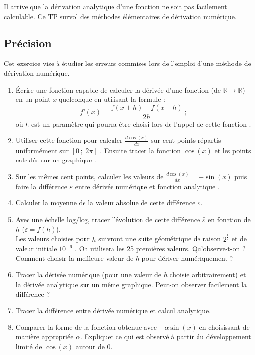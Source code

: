 Il  arrive que  la dérivation  analytique d'une  fonction ne  soit pas
facilement  calculable.  Ce TP  survol  des  méthodes élémentaires  de
dérivation numérique.

\subsection{Précision}
Cet exercice vise à étudier les erreurs commises lors de l'emploi d'une
méthode de dérivation numérique.
\begin{enumerate}
\item Écrire une fonction capable de calculer la dérivée d'une fonction
  (de  $\mathbb{R}  \longrightarrow  \mathbb{R}$)   en  un  point  $x$
  quelconque en utilisant la formule :
  $$f'(x)= \frac{f(x+h)-f(x-h)}{2h}\,;$$  où $h$ est un  paramètre qui
  pourra   être   choisi   lors   de   l'appel   de   cette   fonction
  .  %
\item Utiliser cette fonction  pour calculer $\frac{d\cos(x)}{dx}$ sur
  cent points répartis uniformément sur $[0\,;\,\,2\pi]$ .
  Ensuite tracer la  fonction $\cos(x)$ et les points  calculés sur un
  graphique .  %
\item   Sur  les   mêmes  cent   points,  calculer   les  valeurs   de
  $\frac{d\cos(x)}{dx}   =   -\sin(x)$   puis  faire   la   différence
  $\varepsilon$ entre dérivée numérique et fonction analytique %
.
\item Calculer  la moyenne  de la valeur  absolue de  cette différence
  $\bar{\varepsilon}$.  %
\item Avec  une échelle  log/log, tracer  l'évolution de  cette différence
  $\bar{\varepsilon}$         en        fonction         de        $h$
  ($\bar{\varepsilon}=f(h)$).\\ Les valeurs choisies pour $h$ suivront
  une  suite  géométrique  de  raison  $2^\frac{1}{2}$  et  de  valeur
  initiale  $10^{-6}$ .   On  utilisera  les 25  premières
  valeurs.  Qu'observe-t-on ?  Comment  choisir la meilleure valeur de
  $h$ pour dériver numériquement ?
\item  Tracer la  dérivée numérique  (pour une  valeur de  $h$ choisie
  arbitrairement)   et    la   dérivée   analytique   sur    un   même
  graphique. Peut-on observer facilement la différence ?
\item  Tracer   la  différence   entre  dérivée  numérique   et  calcul
  analytique.
\item Comparer la forme de  la fonction obtenue avec $-\alpha \sin(x)$
  en choisissant de manière appropriée $\alpha$.  Expliquer ce qui est
  observé à partir du développement limité de $\cos(x)$ autour de $0$.
\end{enumerate}

